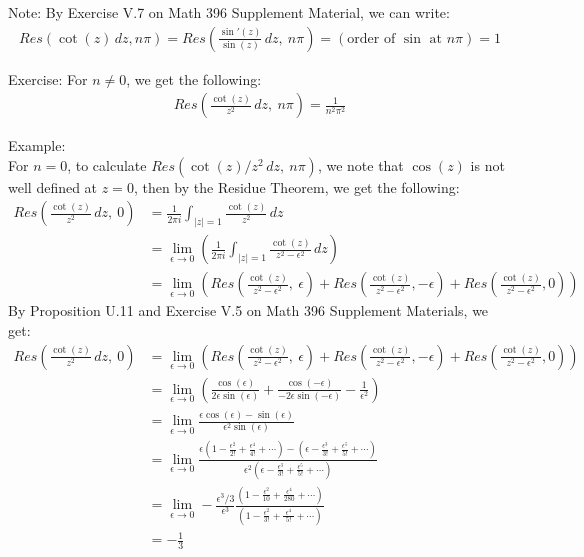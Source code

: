 \documentclass[15pt]{book}
\theoremstyle{break}
\theoremstyle{break}
\newcommand{\note}{\color{red}Note: \color{black}}
\newcommand{\example}{\color{green}Example: \color{black}}
\newcommand{\exercise}{\color{green}Exercise: \color{black}}
\begin{document}
\note By Exercise V.7 on Math 396 Supplement Material, we can write:
\begin{align*}
Res\left( \cot(z) \, dz , n\pi\right) = Res\left( \frac{\sin'(z)}{\sin(z)}\, dz , \ n\pi\right) = (\text{order of }\sin \text{ at }n\pi) = 1
\end{align*}
\newpage

\exercise For $n \neq 0$, we get the following:
\begin{align*}
Res\left(\frac{\cot(z)}{z^2}\, dz, \ n\pi\right) = \frac{1}{n^2 \pi^2} 
\end{align*}

\hfill\break
\example \\For $n = 0$, to calculate $Res(\cot(z)/z^2\, dz, \ n\pi)$, we note that $\cos(z)$ is not well defined at $z = 0$, then by the Residue Theorem, we get the following:
\begin{align*}
Res\left(\frac{\cot(z)}{z^2}\, dz, \ 0\right) &= \frac{1}{2\pi i}\int_{|z|=1}\frac{\cot (z)}{z^2}\, dz \\
&= \lim_{\epsilon\to 0}\left( \frac{1}{2\pi i}\int_{|z| = 1}\frac{\cot(z)}{z^2 - \epsilon^2}\, dz \right) \\
&= \lim_{\epsilon \to 0}\left( Res\left(\frac{\cot(z)}{z^2 - \epsilon^2} ,\ \epsilon\right) + Res\left(\frac{\cot(z)}{z^2 - \epsilon^2} , -\epsilon\right) + Res\left(\frac{\cot(z)}{z^2 - \epsilon^2}, 0\right)\right)
\end{align*}
By Proposition U.11 and Exercise V.5 on Math 396 Supplement Materials, we get:
\begin{align*}
Res\left(\frac{\cot(z)}{z^2}\, dz, \ 0\right) 
&= \lim_{\epsilon \to 0}\left( Res\left(\frac{\cot(z)}{z^2 - \epsilon^2} ,\ \epsilon\right) + Res\left(\frac{\cot(z)}{z^2 - \epsilon^2} , -\epsilon\right) + Res\left(\frac{\cot(z)}{z^2 - \epsilon^2}, 0\right)\right)\\
&= \lim_{\epsilon \to 0}\left( \frac{\cos(\epsilon)}{2\epsilon \sin(\epsilon)} + \frac{\cos(-\epsilon)}{-2\epsilon \sin(-\epsilon)} -\frac{1}{\epsilon^2}\right)\\ 
&= \lim_{\epsilon\to 0}\frac{\epsilon\cos(\epsilon)-\sin(\epsilon)}{\epsilon^2 \sin(\epsilon)}\\
&= \lim_{\epsilon\to 0}\frac{\epsilon(1- \frac{\epsilon^2}{2!}+\frac{\epsilon^4}{4!}+ \cdots) - ( \epsilon - \frac{\epsilon^3}{3!}+ \frac{\epsilon^5}{5!}+\cdots )}{\epsilon^2( \epsilon - \frac{\epsilon^3}{3!}+ \frac{\epsilon^5}{5!}+\cdots )}\\
&= \lim_{\epsilon\to 0} -\frac{\epsilon^3/3}{\epsilon^3} \frac{( 1 - \frac{\epsilon^2}{10}+ \frac{\epsilon^4}{280}+\cdots )}{( 1 - \frac{\epsilon^2}{3!}+ \frac{\epsilon^4}{\,\,5!\,\,}+\cdots )} \\
&= -\frac{1}{3}
\end{align*}
\end{document}
